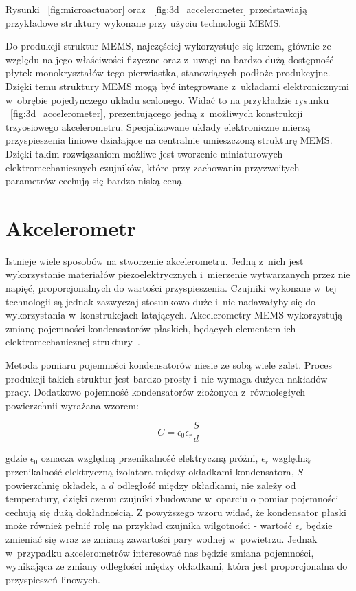 Rysunki ~\ref{fig:microactuator} oraz ~\ref{fig:3d_accelerometer} przedstawiają przykładowe struktury wykonane przy użyciu technologii MEMS. 

Do produkcji struktur MEMS, najczęściej wykorzystuje się krzem, głównie ze względu na jego właściwości fizyczne oraz z~uwagi na bardzo dużą dostępność płytek monokryształów tego pierwiastka, stanowiących podłoże produkcyjne. Dzięki temu struktury MEMS mogą być integrowane z~układami elektronicznymi w~obrębie pojedynczego układu scalonego. Widać to na przykładzie rysunku ~\ref{fig:3d_accelerometer}, prezentującego jedną z~możliwych konstrukcji trzyosiowego akcelerometru. Specjalizowane układy elektroniczne mierzą przyspieszenia liniowe działające na centralnie umieszczoną strukturę MEMS. Dzięki takim rozwiązaniom możliwe jest tworzenie miniaturowych elektromechanicznych czujników, które przy zachowaniu przyzwoitych parametrów cechują się bardzo niską ceną.   

\section{Akcelerometr}

Istnieje wiele sposobów na stworzenie akcelerometru. Jedną z~nich jest wykorzystanie materiałów piezoelektrycznych i~mierzenie wytwarzanych przez nie napięć, proporcjonalnych do wartości przyspieszenia. Czujniki wykonane w~tej technologii są jednak zazwyczaj stosunkowo duże i~nie nadawałyby się do wykorzystania w~konstrukcjach latających. Akcelerometry MEMS wykorzystują zmianę pojemności kondensatorów płaskich, będących elementem ich elektromechanicznej struktury~\cite{mems12}.

Metoda pomiaru pojemności kondensatorów niesie ze sobą wiele zalet. Proces produkcji takich struktur jest bardzo prosty i~nie wymaga dużych nakładów pracy. Dodatkowo pojemność kondensatorów złożonych z~równoległych powierzchnii wyrażana wzorem:   

\begin{equation}
C = \epsilon_0\epsilon_r\frac{S}{d}
\end{equation}

gdzie $\epsilon_0$ oznacza względną przenikalność elektryczną próżni, $\epsilon_r$ względną przenikalność elektryczną izolatora między okładkami kondensatora, $S$ powierzchnię okładek, a $d$ odległość między okładkami, nie zależy od temperatury, dzięki czemu czujniki zbudowane w~oparciu o pomiar pojemności cechują się dużą dokładnością. Z powyższego wzoru widać, że kondensator płaski może również pełnić rolę na przykład czujnika wilgotności - wartość $\epsilon_r$ będzie zmieniać się wraz ze zmianą zawartości pary wodnej w~powietrzu. Jednak w~przypadku akcelerometrów interesować nas będzie zmiana pojemności, wynikająca ze zmiany odległości między okładkami, która jest proporcjonalna do przyspieszeń linowych.

